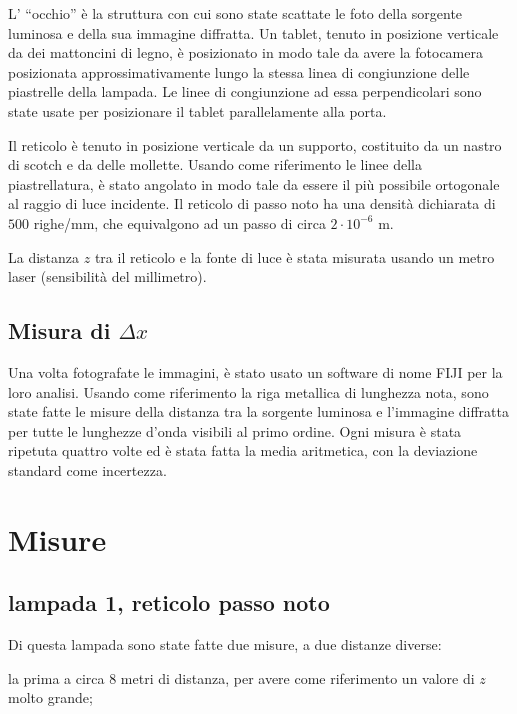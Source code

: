 \documentclass{article}
\begin{document}
L' ``occhio'' è la struttura con cui sono state scattate le foto della sorgente luminosa e della sua immagine diffratta. Un tablet, tenuto in posizione verticale da dei mattoncini di legno, è posizionato in modo tale da avere la fotocamera posizionata approssimativamente lungo la stessa linea di congiunzione delle piastrelle della lampada. Le linee di congiunzione ad essa perpendicolari sono state usate per posizionare il tablet parallelamente alla porta.

\vspace{5mm}

Il reticolo è tenuto in posizione verticale da un supporto, costituito da un nastro di scotch e da delle mollette. Usando come riferimento le linee della piastrellatura, è stato angolato in modo tale da essere il più possibile ortogonale al raggio di luce incidente. Il reticolo di passo noto ha una densità dichiarata di $500$ righe/mm, che equivalgono ad un passo di circa $2 \cdot 10^{-6}$ m.

\vspace{5mm}

La distanza $z$ tra il reticolo e la fonte di luce è stata misurata usando un metro laser (sensibilità del millimetro).

\subsection{Misura di $\Delta x$}

Una volta fotografate le immagini, è stato usato un software di nome FIJI per la loro analisi. Usando come riferimento la riga metallica di lunghezza nota, sono state fatte le misure della distanza tra la sorgente luminosa e l'immagine diffratta per tutte le lunghezze d'onda visibili al primo ordine. Ogni misura è stata ripetuta quattro volte ed è stata fatta la media aritmetica, con la deviazione standard come incertezza. 

\section{Misure}

\subsection{lampada 1, reticolo passo noto}

Di questa lampada sono state fatte due misure, a due distanze diverse:

la prima a circa 8 metri di distanza, per avere come riferimento un valore di $z$ molto grande; 
\end{document}
